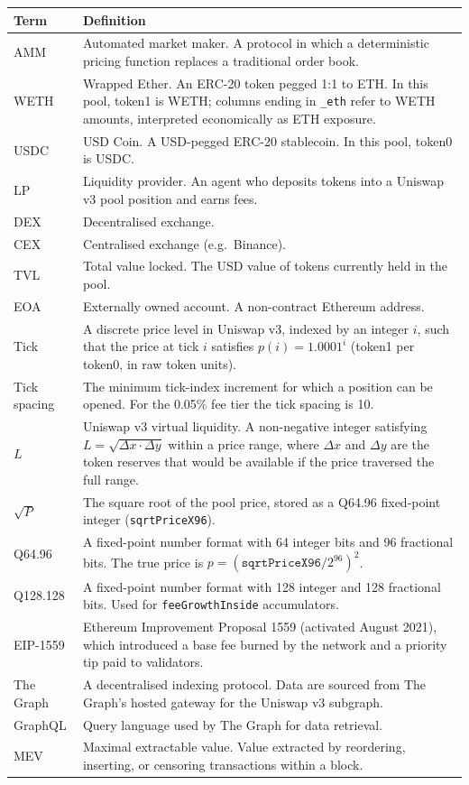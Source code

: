 \documentclass[11pt,a4paper]{article}
\begin{document}
\begin{xltabular}{\linewidth}{L{3.0cm}Y}
\toprule
\textbf{Term} & \textbf{Definition} \\
\midrule
AMM & Automated market maker. A protocol in which a deterministic pricing
      function replaces a traditional order book. \\
WETH & Wrapped Ether. An ERC-20 token pegged 1:1 to ETH. In this pool,
      token1 is WETH; columns ending in \texttt{\_eth} refer to WETH
      amounts, interpreted economically as ETH exposure. \\
USDC & USD Coin. A USD-pegged ERC-20 stablecoin. In this pool, token0 is
      USDC. \\
LP & Liquidity provider. An agent who deposits tokens into a Uniswap v3
     pool position and earns fees. \\
DEX & Decentralised exchange. \\
CEX & Centralised exchange (e.g.\ Binance). \\
TVL & Total value locked. The USD value of tokens currently held in the
      pool. \\
EOA & Externally owned account. A non-contract Ethereum address. \\
Tick & A discrete price level in Uniswap v3, indexed by an integer $i$,
      such that the price at tick $i$ satisfies $p(i)=1.0001^{i}$ (token1
      per token0, in raw token units). \\
Tick spacing & The minimum tick-index increment for which a position can be
      opened. For the 0.05\% fee tier the tick spacing is 10. \\
$L$ & Uniswap v3 virtual liquidity. A non-negative integer satisfying
      $L = \sqrt{\Delta x \cdot \Delta y}$ within a price range, where
      $\Delta x$ and $\Delta y$ are the token reserves that would be
      available if the price traversed the full range. \\
$\sqrt{P}$ & The square root of the pool price, stored as a Q64.96
             fixed-point integer (\texttt{sqrtPriceX96}). \\
Q64.96 & A fixed-point number format with 64 integer bits and 96 fractional
         bits. The true price is $p = (\texttt{sqrtPriceX96}/2^{96})^{2}$. \\
Q128.128 & A fixed-point number format with 128 integer and 128 fractional
           bits. Used for \texttt{feeGrowthInside} accumulators. \\
EIP-1559 & Ethereum Improvement Proposal 1559 (activated August 2021),
           which introduced a base fee burned by the network and a priority
           tip paid to validators. \\
The Graph & A decentralised indexing protocol. Data are sourced from The
            Graph's hosted gateway for the Uniswap v3 subgraph. \\
GraphQL & Query language used by The Graph for data retrieval. \\
MEV & Maximal extractable value. Value extracted by reordering, inserting,
      or censoring transactions within a block. \\
\bottomrule
\end{xltabular}
\end{document}
